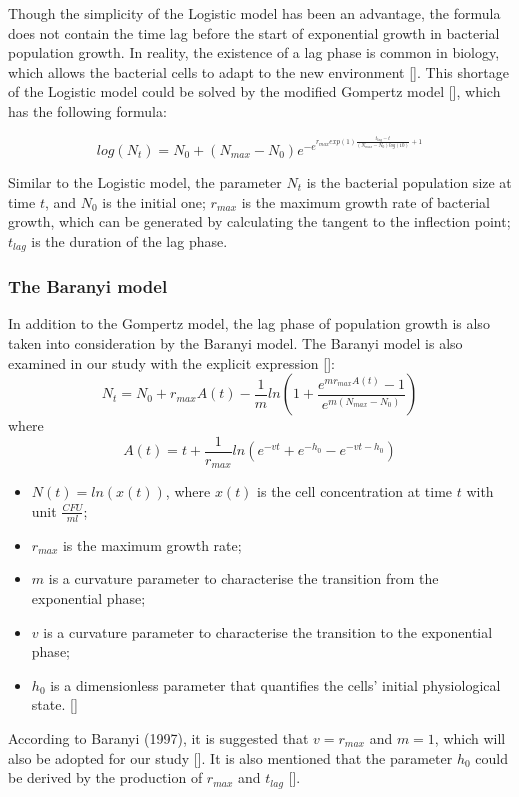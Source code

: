 \documentclass[11pt, oneside]{article}
\begin{document}
			Though the simplicity of the Logistic model has been an advantage, the formula does not contain the time lag before the start of exponential growth in bacterial population growth. In reality, the existence of a lag phase is common in biology, which allows the bacterial cells to adapt to the new environment [\cite{rolfe2012lag}]. This shortage of the Logistic model could be solved by the modified Gompertz model [\cite{zwietering1991modeling}], which has the following formula:
			
			\[log(N_t) = N_0 + (N_{max} - N_0) e^{-e^{r_{max}exp(1)\frac{t_{lag}-t}{(N_{max}-N_0)log(10)} + 1}}\]
			
			\bigbreak
			\noindent Similar to the Logistic model, the parameter \(N_t\) is the bacterial population size at time \(t\), and \(N_0\) is the initial one; \(r_{max}\) is the maximum growth rate of bacterial growth, which can be generated by calculating the tangent to the inflection point; \(t_{lag}\) is the duration of the lag phase.
			
			\subsubsection{The Baranyi model}
			
			In addition to the Gompertz model, the lag phase of population growth is also taken into consideration by the Baranyi model. The Baranyi model is also examined in our study with the explicit expression [\cite{baranyi1994dynamic}]:
			\[N_t = N_0 + r_{max} A(t) - \frac{1}{m}ln(1 + \frac{e^{mr_{max}A(t)} - 1}{e^{m(N_{max} - N_0)}})\]
			where
			\[A(t) = t + \frac{1}{r_{max}}ln(e^{-vt} + e^{-h_0} - e^{-vt - h_0}) \]
			\begin{itemize}
			\item \(N(t) = ln(x(t))\), where \(x(t)\) is the cell concentration at time \(t\) with unit \(\frac{CFU}{ml}\);
			\item \(r_{max}\) is the maximum growth rate;
			\item \(m\) is a curvature parameter to characterise the transition from the exponential phase;
			\item \(v\) is a curvature parameter to characterise the transition to the exponential phase;
			\item \(h_0\) is a dimensionless parameter that quantifies the cells' initial physiological state. [\cite{grijspeerdt1999estimating}]
			\end{itemize}
			\noindent According to Baranyi (1997), it is suggested that \(v = r_{max}\) and \(m = 1\), which will also be adopted for our study [\cite{grijspeerdt1999estimating}]. It is also mentioned that the parameter \(h_0\) could be derived by the production of \(r_{max}\) and \(t_{lag}\) [\cite{baranyi1994dynamic}]. 
			
\end{document}
